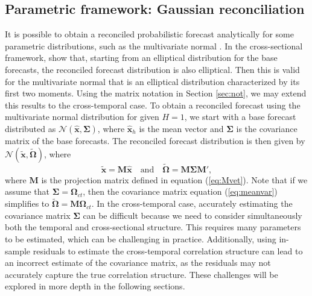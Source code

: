 \documentclass[a4paper,11pt]{article}
\newcommand{\xvet}{\bm{x}}
\newcommand{\Mvet}{\bm{M}}
\newcommand{\Omegavet}{\bm{\Omega}}
\newcommand{\Sigmavet}{\bm{\Sigma}}
\theoremstyle{definition}
\begin{document}
\subsection{Parametric framework: Gaussian reconciliation}\label{ssec:prob_pf}
It is possible to obtain a reconciled probabilistic forecast analytically for some parametric distributions, such as the multivariate normal \citep{panagiotelis2023, wickramasuriya2021b, corani2021, eckert2021}. In the cross-sectional framework, \cite{panagiotelis2023} show that, starting from an elliptical distribution for the base forecasts, the reconciled forecast distribution is also elliptical. Then this is valid for the multivariate normal that is an elliptical distribution characterized by its first two moments. Using the matrix notation in Section \ref{sec:not}, we may extend this results to the cross-temporal case.
To obtain a reconciled forecast using the multivariate normal distribution for given  $H = 1$, we start with a base forecast distributed as $\mathcal{N}(\widehat{\xvet}, \Sigmavet)$, where $\widehat{\xvet}_h$ is the mean vector and $\Sigmavet$ is the covariance matrix of the base forecasts. The reconciled forecast distribution is then given by $\mathcal{N}(\widetilde{\xvet}, \widetilde{\Omegavet})$, where
\begin{equation}\label{eq:meanvar}
	\widetilde{\xvet} = \Mvet\widehat{\xvet} \quad \mbox{and} \quad \widetilde{\Omegavet} = \Mvet \Sigmavet \Mvet',
\end{equation}
where $\Mvet$ is the projection matrix defined in equation (\ref{eq:Mvet}).
Note that if we assume that $\Sigmavet = \Omegavet_{ct}$, then the covariance matrix equation (\ref{eq:meanvar}) simplifies to $\widetilde{\Omegavet} = \Mvet \Omegavet_{ct}$.
In the cross-temporal case, accurately estimating the covariance matrix $\Sigmavet$ can be difficult because we need to consider simultaneously both the temporal and cross-sectional structure. This requires many parameters to be estimated, which can be challenging in practice. Additionally, using in-sample residuals to estimate the cross-temporal correlation structure can lead to an incorrect estimate of the covariance matrix, as the residuals may not accurately capture the true correlation structure. These challenges will be explored in more depth in the following sections.
\end{document}
